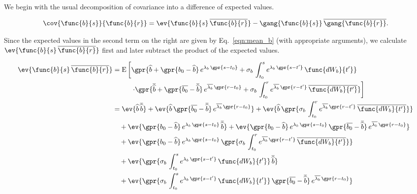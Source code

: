 We begin with the usual decomposition of covariance into a difference of expected values.

\begin{equation}
	\cov{\func{b}{s}}{\func{b}{r}} = \ev{\func{b}{s}\,\overline{\func{b}{r}}} - \gang{\func{b}{s}}\,\overline{\gang{\func{b}{r}}}.
\end{equation}

Since the expected values in the second term on the right are given by Eq.~\ref{eqn:mean_b} (with appropriate arguments), we calculate $\ev{\func{b}{s}\,\overline{\func{b}{r}}}$ first and later subtract the product of the expected values.

\begin{align}
    \ev{\func{b}{s}\,\overline{\func{b}{r}}} &= \text{E}\left[ \gpr{\widehat{b} + \gpr{b_0 - \widehat{b}}\,e^{\lambda_{b}\,\gpr{s - t_0}} + \sigma_{b}\,\int_{t_{0}}^{s} e^{\lambda_b\,\gpr{s - t'}}\,\func{d{W}_{b}}{t'}} \right. \nonumber \\
    		&\phantom{\text{E}}\qquad \left. \cdot \gpr{\overline{\widehat{b}} + \gpr{\overline{b_0} - \overline{\widehat{b}}}\,e^{\overline{\lambda_{b}}\,\gpr{r - t_0}} + \sigma_{b}\,\int_{t_{0}}^{r} e^{\overline{\lambda_b}\,\gpr{r - t'}}\,\overline{\func{d{W}_{b}}{t'}}} \right] \nonumber \\
    	&= \ev{\widehat{b}\,\overline{\widehat{b}}} + \ev{\widehat{b}\,\gpr{\overline{b_0} - \overline{\widehat{b}}}\,e^{\overline{\lambda_{b}}\,\gpr{r - t_0}}} + \ev{\widehat{b}\,\gpr{\sigma_{b}\,\int_{t_{0}}^{r} e^{\overline{\lambda_b}\,\gpr{r - t'}}\,\overline{\func{d{W}_{b}}{t'}}}} \nonumber \\
    		&\quad + \ev{\gpr{b_0 - \widehat{b}}\,e^{\lambda_{b}\,\gpr{s - t_0}}\,\overline{\widehat{b}}} + \ev{\gpr{b_0 - \widehat{b}}\,e^{\lambda_{b}\,\gpr{s - t_0}}\,\gpr{\overline{b_0} - \overline{\widehat{b}}}\,e^{\overline{\lambda_{b}}\,\gpr{r - t_0}}} \nonumber \\
    		&\quad + \ev{\gpr{b_0 - \widehat{b}}\,e^{\lambda_{b}\,\gpr{s - t_0}}\,\gpr{\sigma_{b}\,\int_{t_{0}}^{r} e^{\overline{\lambda_b}\,\gpr{r - t'}}\,\overline{\func{d{W}_{b}}{t'}}}} \nonumber \\
    		&\quad + \ev{\gpr{\sigma_{b}\,\int_{t_{0}}^{s} e^{\lambda_b\,\gpr{s - t'}}\,\func{d{W}_{b}}{t'}}\,\overline{\widehat{b}}} \nonumber \\
    		&\quad + \ev{\gpr{\sigma_{b}\,\int_{t_{0}}^{s} e^{\lambda_b\,\gpr{s - t'}}\,\func{d{W}_{b}}{t'}}\,\gpr{\overline{b_0} - \overline{\widehat{b}}}\,e^{\overline{\lambda_{b}}\,\gpr{r - t_0}}} \nonumber \\

\end{align}
